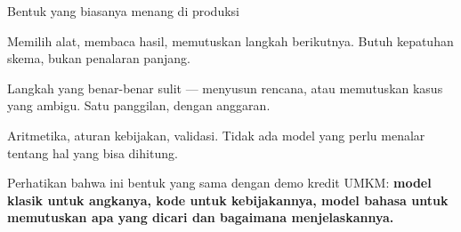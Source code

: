 \documentclass[aspectratio=169,11pt,t]{beamer}
\begin{document}
\begin{frame}[shrink=25]{Bentuk yang biasanya menang di produksi}
\begin{minipage}[t]{0.3253\textwidth}
\begin{icardgood}
Memilih alat, membaca hasil, memutuskan langkah berikutnya. Butuh kepatuhan skema, bukan penalaran panjang.
\end{icardgood}
\end{minipage}%
\hfill
\begin{minipage}[t]{0.3253\textwidth}
\begin{icardaccent}
Langkah yang benar-benar sulit --- menyusun rencana, atau memutuskan kasus yang ambigu. Satu panggilan, dengan anggaran.
\end{icardaccent}
\end{minipage}%
\hfill
\begin{minipage}[t]{0.3253\textwidth}
\begin{icardgood}
Aritmetika, aturan kebijakan, validasi. Tidak ada model yang perlu menalar tentang hal yang bisa dihitung.
\end{icardgood}
\end{minipage}%
\begin{iband}[signal]
Perhatikan bahwa ini bentuk yang sama dengan demo kredit UMKM: \textbf{model klasik untuk angkanya, kode untuk kebijakannya, model bahasa untuk memutuskan apa yang dicari dan bagaimana menjelaskannya.}
\end{iband}
\end{frame}
\end{document}
